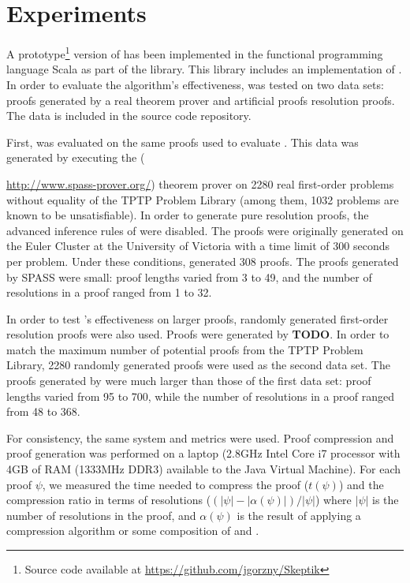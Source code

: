 \section{Experiments} \label{sec:exp}

A prototype\footnote{Source code available at \url{https://github.com/jgorzny/Skeptik}} version of {\FORPI} has been implemented in the functional programming language Scala as part of the \skeptik
library. This library includes an implementation of {\GFOLU} \cite{GFOLU}. In order to evaluate the algorithm's effectiveness, {\FORPI} was tested on two data sets: proofs generated by a real theorem prover and artificial proofs resolution proofs. The data is included in the source code repository.

First, {\FORPI} was evaluated on the same proofs used to evaluate {\GFOLU}. This data was generated by executing the {\SPASS} ({\url{http://www.spass-prover.org/}) theorem prover on 2280 real first-order problems without equality of the TPTP Problem Library (among them, 1032 problems are known to be unsatisfiable). In order to generate pure resolution proofs, the advanced inference rules of {\SPASS} were disabled. The proofs were originally generated on the Euler Cluster at the University of Victoria with a time limit of 300 seconds per problem. Under these conditions, {\SPASS} generated 308 proofs. The proofs generated by SPASS were small: proof lengths varied from 3 to 49, and the number of resolutions in a proof ranged from 1 to 32.


In order to test {\FORPI}'s effectiveness on larger proofs, randomly generated first-order resolution proofs were also used.
Proofs were generated by {\bf TODO}.
In order to match the maximum number of potential proofs from the TPTP Problem Library, 2280 randomly generated proofs were used as the second data set. The proofs generated by were much larger than those of the first data set: proof lengths varied from 95 to 700, while the number of resolutions in a proof ranged from 48 to 368.

For consistency, the same system and metrics were used. Proof compression and proof generation was performed on a laptop (2.8GHz Intel Core i7 processor with 4GB of RAM (1333MHz DDR3) available to the Java Virtual Machine). For each proof $\psi$, we measured the time needed to compress the proof ($t(\psi)$) and the compression ratio in terms of resolutions ($(|\psi|-|\alpha(\psi)|)/|\psi|$) where $|\psi|$ is the number of resolutions in the proof, and $\alpha(\psi)$ is the result of applying a compression algorithm or some composition of {\FORPI} and {\GFOLU}.

}
